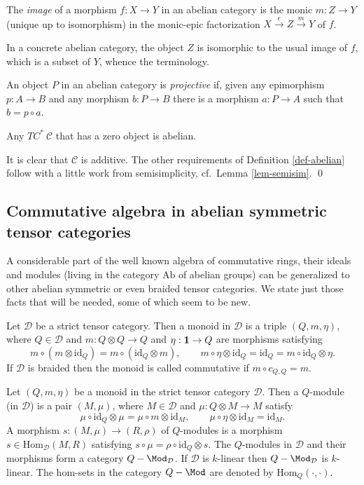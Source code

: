 \documentclass[11pt]{article}
\theoremstyle{definition}
\theoremstyle{definition}
\theoremstyle{remark}
\def\2#1{{\mathcal #1}}
\def\1#1{{\bf #1}}
\newcommand{\Hom}{\mathrm{Hom}}
\newcommand{\rarr}{\rightarrow}
\def\id{\mathrm{id}}
\begin{document}
\bdefin {} 
The \emph{image} of a morphism $f:X\rarr Y$ in an abelian category is the monic $m:Z\rarr Y$ (unique
up to isomorphism) in the monic-epic factorization $X\stackrel{e}{\rarr}Z\stackrel{m}{\rarr}Y$ of
$f$.
\edefin

In a concrete abelian category, the object $Z$ is isomorphic to the usual image of $f$, which is a
subset of $Y$, whence the terminology.

\bdefin \label{def-proj} 
An object $P$ in an abelian category is \emph{projective} if, given any epimorphism
$p:A\rarr B$ and any morphism $b:P\rarr B$ there is a morphism $a:P\rarr A$ such that $b=p\circ a$. 
\edefin

\blemma \label{lem-abel}
Any $TC^*\ \2C$ that has a zero object is abelian.
\elemma

\prf It is clear that $\2C$ is additive. The other requirements of Definition \ref{def-abelian}
follow with a little work from semisimplicity, cf.\ Lemma \ref{lem-semisim}.
\qed



\subsection{Commutative algebra in abelian symmetric tensor categories} \label{ss-comm-alg}
A considerable part of the well known algebra of commutative rings, their ideals and modules (living
in the category $\mathrm{Ab}$ of abelian groups) can be generalized to other abelian symmetric or
even braided tensor categories. We state just those facts that will be needed, some of which seem
to be new.

\bdefin \label{def-monoid} 
Let $\2D$ be a strict tensor category. Then a monoid in $\2D$ is a triple $(Q,m,\eta)$,
where $Q\in\2D$ and $m: Q\otimes Q\rarr Q$ and $\eta: \11\rarr Q$ are morphisms satisfying
\[ m\circ(m\otimes\id_Q)=m\circ(\id_Q\otimes m),\quad \quad
   m\circ\eta\otimes\id_Q=\id_Q=m\circ\id_Q\otimes\eta. \]
If $\2D$ is braided then the monoid is called commutative if $m\circ c_{Q,Q}=m$.
\edefin

\bdefin \label{def-module} 
Let $(Q,m,\eta)$ be a monoid in the strict tensor category $\2D$. Then a $Q$-module (in
$\2D$) is a pair $(M,\mu)$, where $M\in\2D$ and $\mu:Q\otimes M\rarr M$ satisfy
\[ \mu\circ\id_Q\otimes \mu = \mu\circ m\otimes\id_M, \quad\quad \mu\circ\eta\otimes\id_M=\id_M. \]
A morphism $s: (M,\mu)\rarr(R,\rho)$ of $Q$-modules is a morphism $s\in\Hom_\2D(M,R)$ satisfying
$s\circ\mu=\rho\circ\id_Q\otimes s$. The $Q$-modules in $\2D$ and their morphisms form a category
$Q-\Mod_\2D$. If $\2D$ is $k$-linear then $Q-\Mod_\2D$ is $k$-linear. The hom-sets in the category
$Q-\Mod$ are denoted by $\Hom_Q(\cdot,\cdot)$.
\edefin
\end{document}
